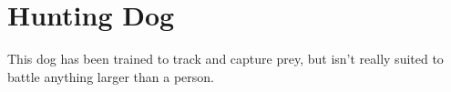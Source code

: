 \section{Hunting Dog}

This dog has been trained to track and capture prey, but isn't really suited to battle anything larger than a person.